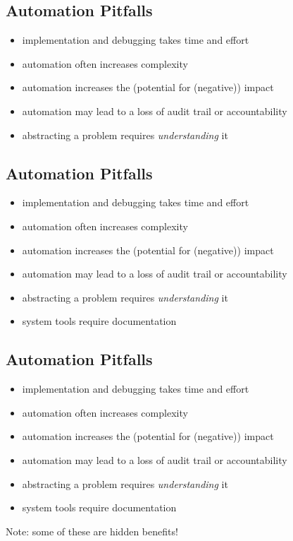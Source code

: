 \documentclass[xga]{xdvislides}
\begin{document}
\subsection{Automation Pitfalls}
\begin{itemize}
	\item implementation and debugging takes time and effort
	\item automation often increases complexity
	\item automation increases the (potential for (negative)) impact
	\item automation may lead to a loss of audit trail or accountability
	\item abstracting a problem requires {\em understanding} it
\end{itemize}


\subsection{Automation Pitfalls}
\begin{itemize}
	\item implementation and debugging takes time and effort
	\item automation often increases complexity
	\item automation increases the (potential for (negative)) impact
	\item automation may lead to a loss of audit trail or accountability
	\item abstracting a problem requires {\em understanding} it
	\item system tools require documentation
\end{itemize}

\subsection{Automation Pitfalls}
\begin{itemize}
	\item implementation and debugging takes time and effort
	\item automation often increases complexity
	\item automation increases the (potential for (negative)) impact
	\item automation may lead to a loss of audit trail or accountability
	\item abstracting a problem requires {\em understanding} it
	\item system tools require documentation
\end{itemize}
\vspace{.5in}
Note: some of these are hidden benefits!
\end{document}
